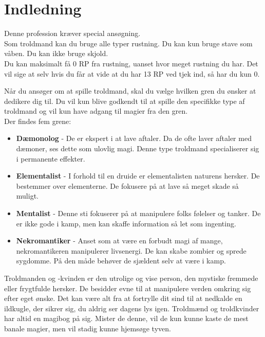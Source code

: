 \chapter{Indledning}

Denne profession kræver special ansøgning.\\
Som troldmand kan du bruge alle typer rustning. Du kan kun bruge stave som våben. Du kan ikke bruge skjold.\\
Du kan maksimalt få 0 RP fra rustning, uanset hvor meget rustning du har. Det vil sige at selv hvis du får at vide at du har 13 RP ved tjek ind, så har du kun 0.

Når du ansøger om at spille troldmand, skal du vælge hvilken gren du ønsker at dedikere dig til. Du vil kun blive godkendt til at spille den specifikke type af troldmand og vil kun have adgang til magier fra den gren.\\
Der findes fem grene:\\
\begin{itemize}
    \item \textbf{Dæmonolog} - De er ekspert i at lave aftaler. Da de ofte laver aftaler med dæmoner, ses dette som ulovlig magi. Denne type troldmand specialiserer sig i permanente effekter.
    \item \textbf{Elementalist} - I forhold til en druide er elementalisten naturens hersker. De bestemmer over elementerne. De fokusere på at lave så meget skade så muligt.
    \item \textbf{Mentalist} - Denne sti fokuserer på at manipulere folks følelser og tanker. De er ikke gode i kamp, men kan skaffe information så let som ingenting.
    \item \textbf{Nekromantiker} - Anset som at være en forbudt magi af mange, nekromantikeren manipulerer livsenergi. De kan skabe zombier og sprede sygdomme. På den måde behøver de sjældent selv at være i kamp.
\end{itemize}

Troldmanden og -kvinden er den utrolige og vise person, den mystiske fremmede eller frygtfulde
hersker. De besidder evne til at manipulere verden omkring sig efter eget ønske. Det kan være alt fra
at fortrylle dit sind til at nedkalde en ildkugle, der sikrer sig, du aldrig ser dagens lys igen. Troldmænd
og troldkvinder har altid en magibog på sig. Mister de denne, vil de kun kunne kaste de mest banale
magier, men vil stadig kunne hjemsøge tyven.

